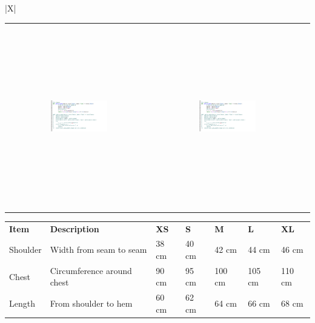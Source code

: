 \documentclass[landscape]{article}
\begin{document}
\noindent\begin{tabularx}{\textwidth}{|X|}
\hline
{} \\
\hline
\begin{center}
\begin{tabular}{ccc}
\includegraphics[width=0.4\textwidth,height=8cm,keepaspectratio]{Screenshot_2025-03-09_at_15.26.02.png} &
\includegraphics[width=0.4\textwidth,height=8cm,keepaspectratio]{Screenshot_2025-03-09_at_15.26.02.png} &
\end{tabular}
\end{center}
\end{tabularx}
\hline

\vspace{0.5cm}

\newpage
\noindent\begin{tabularx}{\textwidth}{|X|X|X|X|X|X|X|}
\hline
\rowcolor{headerred}\multicolumn{7}{|c|}{\textcolor{white}{\textbf{MEASUREMENTS}}} \\
\hline
\textbf{Item} & \textbf{Description} & \textbf{XS} & \textbf{S} & \textbf{M} & \textbf{L} & \textbf{XL}\\
\hline
Shoulder & Width from seam to seam & 38 cm & 40 cm & 42 cm & 44 cm & 46 cm \\
\hline
Chest & Circumference around chest & 90 cm & 95 cm & 100 cm & 105 cm & 110 cm \\
\hline
Length & From shoulder to hem & 60 cm & 62 cm & 64 cm & 66 cm & 68 cm \\
\hline
\end{tabularx}
\end{document}
